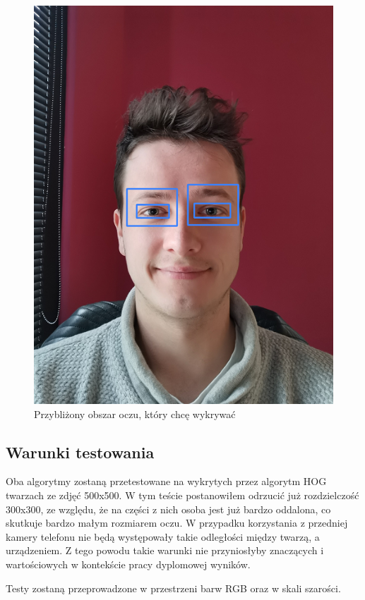 \begin{figure}[!h]
    \begin{center}
        \includegraphics[scale=0.6]{img/pupil_section/expected_eyes_region.png}
        \caption{Przybliżony obszar oczu, który chcę wykrywać}
        \label{fig:expected_eyes_region}
    \end{center}
\end{figure}

\subsection{Warunki testowania}

Oba algorytmy zostaną przetestowane na wykrytych przez algorytm HOG twarzach ze zdjęć 500x500. W tym teście postanowiłem odrzucić już rozdzielczość 300x300, ze względu, że na części z nich osoba jest już bardzo oddalona, co skutkuje bardzo małym rozmiarem oczu. W przypadku korzystania z przedniej kamery telefonu nie będą występowały takie odległości między twarzą, a urządzeniem. Z tego powodu takie warunki nie przyniosłyby znaczących i wartościowych w kontekście pracy dyplomowej wyników. 
\par
Testy zostaną przeprowadzone w przestrzeni barw RGB oraz w skali szarości.

